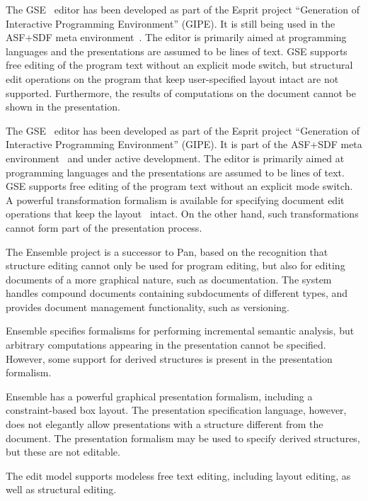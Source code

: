 \documentclass{speauth}
\begin{document}

\bc
The GSE~\cite{koorn92gse} editor has been developed as part of the Esprit project ``Generation of Interactive Programming Environment'' (GIPE). It is still being used in the ASF+SDF meta environment~\cite{klint93asfsdf}. The editor is primarily aimed at programming languages and the presentations are assumed to be lines of text. GSE supports free editing of the program text without an explicit mode switch, but structural edit operations on the program that keep user-specified layout intact are not supported. Furthermore, the results of computations on the document cannot be shown in the presentation. \ec

The GSE~\cite{koorn92gse} editor has been developed as part of the Esprit project ``Generation of Interactive Programming Environment'' (GIPE). It is part of the ASF+SDF meta environment~\cite{klint93asfsdf} and under active development. The editor is primarily aimed at programming languages and the presentations are assumed to be lines of text. GSE supports free editing of the program text without an explicit mode switch. A powerful transformation formalism is available for specifying document edit operations that keep the layout~\cite{brand00rewriteLayout} intact. On the other hand, such transformations cannot form part of the presentation process.


The Ensemble project is a successor to Pan, based on the recognition that structure editing cannot only be used for program editing, but also for editing documents of a more graphical nature, such as documentation. The system handles compound documents containing subdocuments of different types, and provides document management functionality, such as versioning.

Ensemble specifies formalisms for performing incremental semantic analysis, but arbitrary computations appearing in the presentation cannot be specified. However, some support for derived structures is present in the presentation formalism.

Ensemble has a powerful graphical presentation formalism, including a constraint-based box layout. The presentation specification language, however, does not elegantly allow presentations with a structure different from the document. The presentation formalism may be used to specify derived structures, but these are not editable.

The edit model supports modeless free text editing, including layout editing, as well as structural editing.
\end{document}
